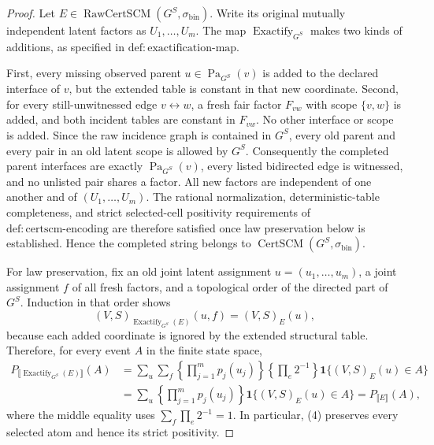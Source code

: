 \documentclass{article}
\begin{document}
\begin{proof}
Let \(E\in\operatorname{RawCertSCM}(G^S,\sigma_{\mathrm{bin}})\).  Write its original mutually independent latent factors as \(U_1,\ldots,U_m\).  The map \(\operatorname{Exactify}_{G^S}\) makes two kinds of additions, as specified in \(\mathrm{def:exactification\text{-}map}\).

First, every missing observed parent \(u\in\operatorname{Pa}_{G^S}(v)\) is added to the declared interface of \(v\), but the extended table is constant in that new coordinate.  Second, for every still-unwitnessed edge \(v\leftrightarrow w\), a fresh fair factor \(F_{vw}\) with scope \(\{v,w\}\) is added, and both incident tables are constant in \(F_{vw}\).  No other interface or scope is added.  Since the raw incidence graph is contained in \(G^S\), every old parent and every pair in an old latent scope is allowed by \(G^S\).  Consequently the completed parent interfaces are exactly \(\operatorname{Pa}_{G^S}(v)\), every listed bidirected edge is witnessed, and no unlisted pair shares a factor.  All new factors are independent of one another and of \((U_1,\ldots,U_m)\).  The rational normalization, deterministic-table completeness, and strict selected-cell positivity requirements of \(\mathrm{def:certscm\text{-}encoding}\) are therefore satisfied once law preservation below is established.  Hence the completed string belongs to \(\operatorname{CertSCM}(G^S,\sigma_{\mathrm{bin}})\).

For law preservation, fix an old joint latent assignment \(u=(u_1,\ldots,u_m)\), a joint assignment \(f\) of all fresh factors, and a topological order of the directed part of \(G^S\).  Induction in that order shows
\[
  (V,S)_{\operatorname{Exactify}_{G^S}(E)}(u,f)=(V,S)_E(u), \tag{3}
\]
because each added coordinate is ignored by the extended structural table.  Therefore, for every event \(A\) in the finite state space,
\[
\begin{aligned}
 P_{\llbracket\operatorname{Exactify}_{G^S}(E)\rrbracket}(A)
 &=\sum_u\sum_f
   \left\{\prod_{j=1}^m p_j(u_j)\right\}
   \left\{\prod_{e}2^{-1}\right\}
   \mathbf 1\{(V,S)_E(u)\in A\}\\
 &=\sum_u\left\{\prod_{j=1}^m p_j(u_j)\right\}
   \mathbf 1\{(V,S)_E(u)\in A\}
 =P_{\llbracket E\rrbracket}(A), \tag{4}
\end{aligned}
\]
where the middle equality uses \(\sum_f\prod_e2^{-1}=1\).  In particular, (4) preserves every selected atom and hence its strict positivity.


\end{proof}
\end{document}
